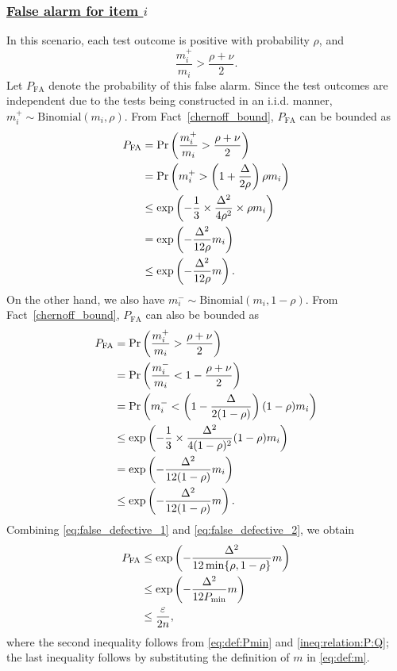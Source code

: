 \documentclass[onecolumn,letterpaper]{IEEEtran}
\newcommand{\nt}{{m}}
\newcommand{\nti}{{\nt_{i}}}
\newcommand{\ntip}{{\nt_{i}^+}}
\newcommand{\ntin}{{\nt_{i}^-}}
\newcommand{\fd}{{P_{\text{FA}}}}
\newcommand{\spn}{{\rho}}
\newcommand{\spp}{{\nu}}
\newcommand{\spmin}{{P_{\min}}}
\newcommand{\spgap}{{\Delta}}
\begin{document}
\subsubsection{\underline{False alarm for item $i$}} 
In this scenario, each test outcome is positive with probability $\spn$, and
\begin{equation}
    \frac{\ntip}{\nti} > \frac{\spn+\spp}{2}.
\end{equation}
Let $\fd$ denote the probability of this false alarm. Since the test outcomes are independent due to the tests being constructed in an i.i.d. manner, $\ntip \sim \text{Binomial}(\nti,\spn)$. From Fact~\ref{chernoff_bound}, $\fd$ can be bounded as
\begin{align}
\label{eq:false_defective_1}
\fd &= \Pr \left( \frac{\ntip}{\nti} > \frac{\spn+\spp}{2} \right) \notag\\
&= \Pr \left( \ntip > \left( 1+\frac{\spgap}{2\spn} \right) \spn \nti \right) \notag\\ 
&\le \exp\left( - \frac{1}{3} \times \frac{\spgap^2}{4\spn^2} \times \spn \nti \right) \notag\\ 
&= \exp \left( -\frac{\spgap^2}{12\spn} \nti \right) \notag\\
&\le \exp \left( -\frac{\spgap^2}{12\spn} \nt \right).
\end{align}
On the other hand, we also have $\ntin \sim \text{Binomial} (\nti,1-\spn)$. From Fact~\ref{chernoff_bound}, $\fd$ can also be bounded as
\begin{align}
\label{eq:false_defective_2}
\fd &= \Pr \left( \frac{\ntip}{\nti} > \frac{\spn+\spp}{2} \right) \notag\\
&= \Pr \left( \frac{\ntin}{\nti} < 1 - \frac{\spn+\spp}{2} \right) \notag\\ 
&= \Pr \left( \ntin < \left( 1 - \frac{\spgap}{2(1-\spn)} \right) (1 - \spn) \nti \right) \notag\\ 
&\le \exp\left( - \frac{1}{3} \times \frac{\spgap^2}{4(1-\spn)^2} (1 - \spn) \nti \right) \notag\\ 
&= \exp \left( - \frac{\spgap^2}{12(1-\spn)} \nti \right) \notag\\
&\le \exp \left( - \frac{\spgap^2}{12(1-\spn)} \nt \right).
\end{align}
Combining \eqref{eq:false_defective_1} and \eqref{eq:false_defective_2}, we obtain
\begin{align} 
\label{eq:false_defective}
\fd &\leq \exp\left( -\frac{\spgap^2}{12\min\{\spn,1-\spn\}}\nt \right) \notag\\
   &\leq \exp\left( - \frac{\spgap^2}{12\spmin} \nt \right)  \notag\\
   &\leq \frac{\varepsilon}{2n},
\end{align}
where the second inequality follows from \eqref{eq:def:Pmin} and \eqref{ineq:relation:P:Q}; the last inequality follows by substituting the definition of $\nt$ in \eqref{eq:def:m}.  
\end{document}
